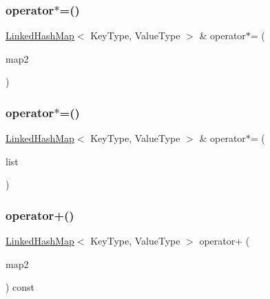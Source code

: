 \mbox{\label{classLinkedHashMap_ae1ab3cc43d53ccab9c73548083ae0ed0}} 
\subsubsection{\texorpdfstring{operator$\ast$=()}{operator*=()}\hspace{0.1cm}{\footnotesize\ttfamily [1/2]}}
{\footnotesize\ttfamily \mbox{\hyperlink{classLinkedHashMap}{Linked\+Hash\+Map}}$<$ Key\+Type, Value\+Type $>$ \& operator$\ast$= (\begin{DoxyParamCaption}\item[{const \mbox{\hyperlink{classLinkedHashMap}{Linked\+Hash\+Map}}$<$ Key\+Type, Value\+Type $>$ \&}]{map2 }\end{DoxyParamCaption})}

\mbox{\label{classLinkedHashMap_af810d63ea278546e8c720048e718c363}} 
\subsubsection{\texorpdfstring{operator$\ast$=()}{operator*=()}\hspace{0.1cm}{\footnotesize\ttfamily [2/2]}}
{\footnotesize\ttfamily \mbox{\hyperlink{classLinkedHashMap}{Linked\+Hash\+Map}}$<$ Key\+Type, Value\+Type $>$ \& operator$\ast$= (\begin{DoxyParamCaption}\item[{std\+::initializer\+\_\+list$<$ std\+::pair$<$ Key\+Type, Value\+Type $>$ $>$}]{list }\end{DoxyParamCaption})}

\mbox{\label{classLinkedHashMap_a6a85e7e170200435c3beb2e930ca64b2}} 
\subsubsection{\texorpdfstring{operator+()}{operator+()}\hspace{0.1cm}{\footnotesize\ttfamily [1/2]}}
{\footnotesize\ttfamily \mbox{\hyperlink{classLinkedHashMap}{Linked\+Hash\+Map}}$<$ Key\+Type, Value\+Type $>$ operator+ (\begin{DoxyParamCaption}\item[{const \mbox{\hyperlink{classLinkedHashMap}{Linked\+Hash\+Map}}$<$ Key\+Type, Value\+Type $>$ \&}]{map2 }\end{DoxyParamCaption}) const}

